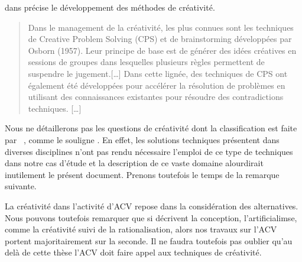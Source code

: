 \citeauthor{arnoux_modeliser_2013} dans  précise le développement des méthodes de créativité.
\blockcquote{arnoux_modeliser_2013}{
Dans le management de la créativité, les plus connues sont les techniques de Creative Problem Solving (CPS) et de brainstorming développées par Osborn (1957).
Leur principe de base est de générer des idées créatives en sessions de groupes dans lesquelles plusieurs règles permettent de suspendre le jugement.[\ldots]
Dans cette lignée, des techniques de CPS ont également été développées pour accélérer la résolution de problèmes en utilisant des connaissances existantes pour résoudre des contradictions techniques. [\ldots]
}
Nous ne détaillerons pas les questions de créativité dont la classification est faite par \citeauthor{mcfadzean_creativity_1998}~\cite{mcfadzean_creativity_1998}, comme le souligne \citeauthor{arnoux_modeliser_2013}.
En effet, les solutions techniques présentent dans diverses disciplines n'ont pas rendu nécessaire l'emploi de ce type de techniques dans notre cas d'étude et la description de ce vaste domaine alourdirait inutilement le présent document.
Prenons toutefois le temps de la remarque suivante.

La créativité dans l'activité d'\gls{ACV} repose dans la considération des alternatives.
Nous pouvons toutefois remarquer que si \citeauthor{micaelli_artificialisme:_2003} décrivent la conception, l'artificialimse, comme la créativité suivi de la rationalisation\cite[p.51]{micaelli_artificialisme:_2003}, alors nos travaux sur l'\gls{ACV} portent majoritairement sur la seconde.
Il ne faudra toutefois pas oublier qu'au delà de cette thèse l'ACV doit faire appel aux techniques de créativité.

